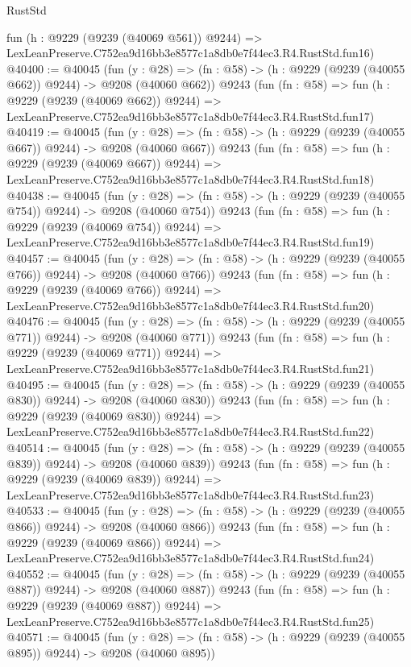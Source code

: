 \begin{lexlean}{RustStd}
\begin{coremodule}
    fun (h : @9229 (@9239 (@40069 @561)) @9244) =>
    LexLeanPreserve.C752ea9d16bb3e8577c1a8db0e7f44ec3.R4.RustStd.fun16)
@40400 := @40045
    (fun (y : @28) => (fn : @58) -> (h : @9229 (@9239 (@40055 @662)) @9244) -> @9208 (@40060 @662))
    @9243
    (fun (fn : @58) =>
    fun (h : @9229 (@9239 (@40069 @662)) @9244) =>
    LexLeanPreserve.C752ea9d16bb3e8577c1a8db0e7f44ec3.R4.RustStd.fun17)
@40419 := @40045
    (fun (y : @28) => (fn : @58) -> (h : @9229 (@9239 (@40055 @667)) @9244) -> @9208 (@40060 @667))
    @9243
    (fun (fn : @58) =>
    fun (h : @9229 (@9239 (@40069 @667)) @9244) =>
    LexLeanPreserve.C752ea9d16bb3e8577c1a8db0e7f44ec3.R4.RustStd.fun18)
@40438 := @40045
    (fun (y : @28) => (fn : @58) -> (h : @9229 (@9239 (@40055 @754)) @9244) -> @9208 (@40060 @754))
    @9243
    (fun (fn : @58) =>
    fun (h : @9229 (@9239 (@40069 @754)) @9244) =>
    LexLeanPreserve.C752ea9d16bb3e8577c1a8db0e7f44ec3.R4.RustStd.fun19)
@40457 := @40045
    (fun (y : @28) => (fn : @58) -> (h : @9229 (@9239 (@40055 @766)) @9244) -> @9208 (@40060 @766))
    @9243
    (fun (fn : @58) =>
    fun (h : @9229 (@9239 (@40069 @766)) @9244) =>
    LexLeanPreserve.C752ea9d16bb3e8577c1a8db0e7f44ec3.R4.RustStd.fun20)
@40476 := @40045
    (fun (y : @28) => (fn : @58) -> (h : @9229 (@9239 (@40055 @771)) @9244) -> @9208 (@40060 @771))
    @9243
    (fun (fn : @58) =>
    fun (h : @9229 (@9239 (@40069 @771)) @9244) =>
    LexLeanPreserve.C752ea9d16bb3e8577c1a8db0e7f44ec3.R4.RustStd.fun21)
@40495 := @40045
    (fun (y : @28) => (fn : @58) -> (h : @9229 (@9239 (@40055 @830)) @9244) -> @9208 (@40060 @830))
    @9243
    (fun (fn : @58) =>
    fun (h : @9229 (@9239 (@40069 @830)) @9244) =>
    LexLeanPreserve.C752ea9d16bb3e8577c1a8db0e7f44ec3.R4.RustStd.fun22)
@40514 := @40045
    (fun (y : @28) => (fn : @58) -> (h : @9229 (@9239 (@40055 @839)) @9244) -> @9208 (@40060 @839))
    @9243
    (fun (fn : @58) =>
    fun (h : @9229 (@9239 (@40069 @839)) @9244) =>
    LexLeanPreserve.C752ea9d16bb3e8577c1a8db0e7f44ec3.R4.RustStd.fun23)
@40533 := @40045
    (fun (y : @28) => (fn : @58) -> (h : @9229 (@9239 (@40055 @866)) @9244) -> @9208 (@40060 @866))
    @9243
    (fun (fn : @58) =>
    fun (h : @9229 (@9239 (@40069 @866)) @9244) =>
    LexLeanPreserve.C752ea9d16bb3e8577c1a8db0e7f44ec3.R4.RustStd.fun24)
@40552 := @40045
    (fun (y : @28) => (fn : @58) -> (h : @9229 (@9239 (@40055 @887)) @9244) -> @9208 (@40060 @887))
    @9243
    (fun (fn : @58) =>
    fun (h : @9229 (@9239 (@40069 @887)) @9244) =>
    LexLeanPreserve.C752ea9d16bb3e8577c1a8db0e7f44ec3.R4.RustStd.fun25)
@40571 := @40045
    (fun (y : @28) => (fn : @58) -> (h : @9229 (@9239 (@40055 @895)) @9244) -> @9208 (@40060 @895))

\end{coremodule}
\end{lexlean}
